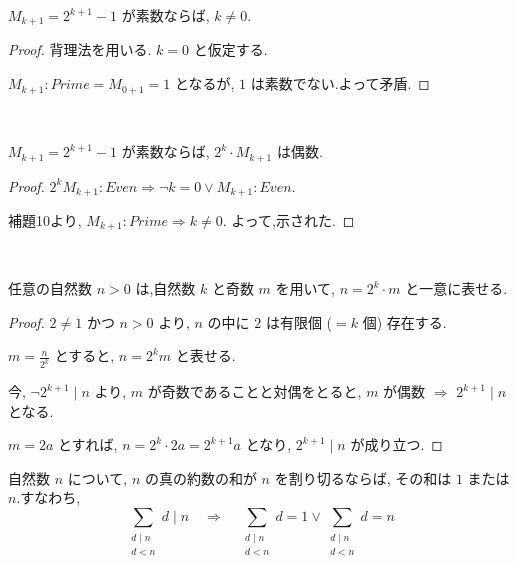 \begin{lemma}\label{ne_zero_of_prime_mersenne}\leanok
{}
\(M_{k+1} = 2^{k+1} - 1\) が素数ならば, \(k \neq 0\).

\end{lemma}

\begin{proof}
背理法を用いる. \(k = 0\) と仮定する.

\(M_{k+1} : Prime = M_{0+1} = 1\) となるが, \(1\) は素数でない.よって矛盾.
\end{proof}


\begin{theorem}\label{even_two_pow_mul_mersenne_of_prime}
\leanok{}~\

\(M_{k+1} = 2^{k+1} - 1\) が素数ならば, \(2^k \cdot M_{k+1}\) は偶数.

\end{theorem}

\begin{proof}
\(2^kM_{k+1} : Even \Rightarrow \lnot k = 0 \vee M_{k+1} : Even\).

補題10より, \(M_{k+1} : Prime \Rightarrow k \neq 0\). よって,示された.
\end{proof}


\begin{lemma}\label{eq_two_pow_mul_odd}\leanok~\

任意の自然数 \(n > 0\) は,自然数 \(k\) と奇数 \(m\) を用いて, \(n = 2^k \cdot m\) と一意に表せる.

\end{lemma}

\begin{proof}
\(2 \neq 1\) かつ \(n > 0\) より, \(n\) の中に \(2\) は有限個 (\(= k\) 個) 存在する.

\(m = \frac{n}{2^k}\) とすると, \(n = 2^km\) と表せる.

今, \(\lnot 2^{k+1} \mid n\) より, \(m\) が奇数であることと対偶をとると,
\(m\) が偶数 \(\Rightarrow\) \(2^{k+1} \mid n\) となる.

\(m = 2a\) とすれば, \(n = 2^k \cdot 2a = 2^{k+1}a\) となり, \(2^{k+1} \mid n\) が成り立つ.
\end{proof}

\begin{lemma}\label{sum_properDivisors_dvd}\leanok

自然数 \(n\) について, \(n\) の真の約数の和が \(n\) を割り切るならば, その和は \(1\) または \(n\).すなわち,
\[
\sum_{\substack{d \mid n\\ d < n}} d \mid n \quad \Rightarrow \quad \sum_{\substack{d \mid n\\ d < n}} d = 1 \vee \sum_{\substack{d \mid n\\ d < n}} d = n
\]

\end{lemma}

